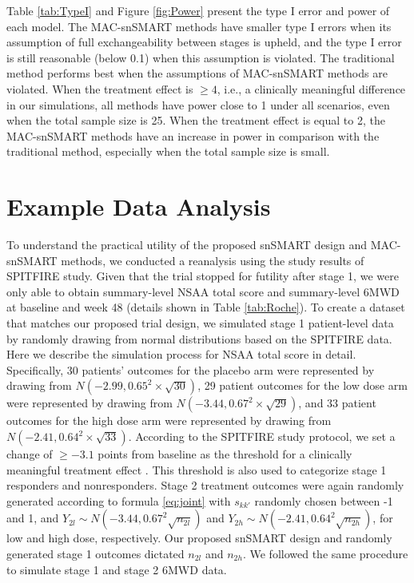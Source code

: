 Table \ref{tab:TypeI} and Figure \ref{fig:Power} present the type I error and power of each model. The \ac{MAC}-snSMART methods have smaller type I errors when its assumption of full exchangeability between stages is upheld, and the type I error is still reasonable (below 0.1) when this assumption is violated. The traditional method performs best when the assumptions of \ac{MAC}-snSMART methods are violated. When the treatment effect is $\geqslant 4$, i.e., a clinically meaningful difference in our simulations, all methods have power close to 1 under all scenarios, even when the total sample size is 25. When the treatment effect is equal to 2, the \ac{MAC}-snSMART methods have an increase in power in comparison with the traditional method, especially when the total sample size is small.      

\section{Example Data Analysis} \label{s:example}

To understand the practical utility of the proposed \ac{snSMART} design and \ac{MAC}-snSMART methods, we conducted a reanalysis using the study results of SPITFIRE study. Given that the trial stopped for futility after stage 1, we were only able to obtain summary-level \ac{NSAA} total score and summary-level \ac{6MWD} at baseline and week 48 (details shown in Table \ref{tab:Roche}). To create a dataset that matches our proposed trial design, we simulated stage 1 patient-level data by randomly drawing from normal distributions based on the SPITFIRE data. Here we describe the simulation process for \ac{NSAA} total score in detail. Specifically, 30 patients' outcomes for the placebo arm were represented by drawing from $N(-2.99, 0.65^2 \times \sqrt{30})$, 29 patient outcomes for the low dose arm were represented by drawing from $N(-3.44, 0.67^2 \times \sqrt{29})$, and 33 patient outcomes for the high dose arm were represented by drawing from $N(-2.41, 0.64^2 \times \sqrt{33})$. According to the SPITFIRE study protocol, we set a change of $\geqslant -3.1$ points from baseline as the threshold for a clinically meaningful treatment effect \citep{muntoni2018minimal}. This threshold is also used to categorize stage 1 responders and nonresponders. Stage 2 treatment outcomes were again randomly generated according to formula \ref{eq:joint} with $s_{kk'}$ randomly chosen between -1 and 1, and $Y_{2l} \sim N(-3.44, 0.67^2\sqrt{n_{2l}})$ and $Y_{2h} \sim N(-2.41, 0.64^2\sqrt{n_{2h}})$, for low and high dose, respectively. Our proposed \ac{snSMART} design and randomly generated stage 1 outcomes dictated $n_{2l}$ and $n_{2h}$. We followed the same procedure to simulate stage 1 and stage 2 \ac{6MWD} data.

